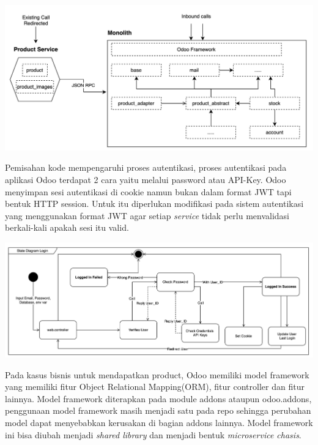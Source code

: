 \begin{center}
	\includegraphics[width=14cm]{img/bab_3/strangelExMicro.png}
	\label{fig:asd}
\end{center}

Pemisahan kode mempengaruhi proses autentikasi, proses autentikasi pada aplikasi Odoo terdapat 2 cara yaitu melalui password atau API-Key. Odoo menyimpan sesi autentikasi di cookie namun bukan dalam format JWT tapi bentuk HTTP session. Untuk itu diperlukan modifikasi pada sistem autentikasi yang menggunakan format JWT agar setiap \textit{service} tidak perlu menvalidasi berkali-kali apakah sesi itu valid. 

\begin{center}
	\includegraphics[width=14cm]{img/bab_3/stateDiagramLogin.png}
	\label{fig:asd}
\end{center}

Pada kasus bisnis untuk mendapatkan product, Odoo memiliki model framework yang memiliki fitur Object Relational Mapping(ORM), fitur controller dan fitur lainnya. Model framework diterapkan pada module addons ataupun odoo.addons, penggunaan model framework masih menjadi satu pada repo sehingga perubahan model dapat menyebabkan kerusakan di bagian addons lainnya. Model framework ini bisa diubah menjadi \textit{shared library} dan menjadi bentuk \textit{microservice chasis}.\\

